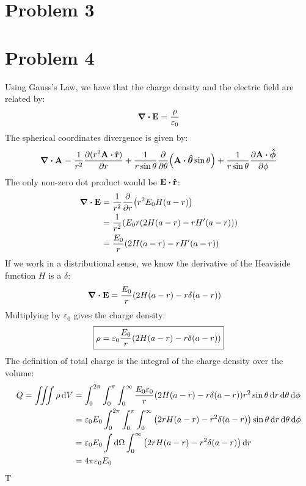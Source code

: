 \documentclass[12pt]{article}
\begin{document}
\section*{Problem 3}

\section*{Problem 4}
Using Gauss's Law, we have that the charge density and the electric field are related by:
\begin{align*}
  \div{\vb{E}}=\frac{\rho}{\varepsilon_0}
\end{align*}
The spherical coordinates divergence is given by:
\begin{align*}
  \div{\vb{A}}=\frac{1}{r^2}\pdv{(r^2\vb{A}\vdot\vu{r})}{r}
  +\frac1{r\sin\theta}\pdv{\theta}(\vb{A}\vdot\bm{\hat\theta}\sin\theta)
  +\frac1{r\sin\theta}\pdv{\vb{A}\vdot\bm{\hat\phi}}{\phi}
\end{align*}
The only non-zero dot product would be $\vb{E}\vdot\vu{r}$:
\begin{align*}
  \div{\vb{E}}&=\frac1{r^2}\pdv{r}\qty(r^2E_0H(a-r))\\
  &=\frac1{r^2}\qty(E_0r\qty(2H(a-r)-rH'(a-r)))\\
  &=\frac{E_0}{r}\qty(2H(a-r)-rH'(a-r))
\end{align*}
If we work in a distributional sense, we know the derivative of the Heaviside function $H$ is a $\delta$:
\begin{align*}
  \div{\vb{E}}&=\frac{E_0}{r}\qty(2H(a-r)-r\delta(a-r))
\end{align*}
Multiplying by $\varepsilon_0$ gives the charge density:
\begin{align}
  \boxed{
    \rho=\varepsilon_0\frac{E_0}{r}\qty(2H(a-r)-r\delta(a-r))
  }
\end{align}
The definition of total charge is the integral of the charge density over the volume:
\begin{align*}
  Q=\iiint\rho\dd{V}&=\int_0^{2\pi}\int_0^\pi\int_0^\infty
  \frac{E_0\varepsilon_0}{r}\qty(2H(a-r)-r\delta(a-r))r^2
  \sin\theta\dd{r}\dd{\theta}\dd{\phi}\\
  &=\varepsilon_0E_0\int_0^{2\pi}\int_0^\pi\int_0^\infty
  \qty(2rH(a-r)-r^2\delta(a-r))\sin\theta\dd{r}\dd{\theta}\dd{\phi}\\
  &=\varepsilon_0E_0\int\dd{\Omega}\int_0^\infty
  \qty(2rH(a-r)-r^2\delta(a-r))\dd{r}\\
  &=4\pi\varepsilon_0E_0
\end{align*}
T
\end{document}
